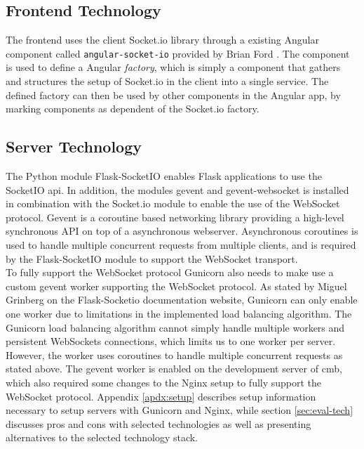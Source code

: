 \subsection{Frontend Technology}
The frontend uses the client Socket.io library \cite{SOCKETIO} through a existing Angular component called \texttt{angular-socket-io} provided by Brian Ford \cite{ANGULARSOCKETIO}. The component is used to define a Angular \textit{factory}, which is simply a component that gathers and structures the setup of Socket.io in the client into a single service. The defined factory can then be used by other components in the Angular app, by marking components as dependent of the Socket.io factory. \\

\subsection{Server Technology}
The Python module Flask-SocketIO \cite{FLASKSOCKETIO} enables Flask applications to use the SocketIO \gls{api}. In addition, the modules gevent \cite{GEVENT} and gevent-websocket \cite{GEVENTWEBSOCKET} is installed in combination with the Socket.io module to enable the use of the WebSocket protocol. Gevent is a coroutine based networking library providing a high-level synchronous API on top of a asynchronous webserver. Asynchronous coroutines is used to handle multiple concurrent requests from multiple clients, and is required by the Flask-SocketIO module to support the WebSocket transport. \\

To fully support the WebSocket protocol Gunicorn also needs to make use a custom gevent worker supporting the WebSocket protocol. As stated by Miguel Grinberg on the Flask-Socketio documentation website, Gunicorn can only enable one worker due to limitations in the implemented load balancing algorithm. The Gunicorn load balancing algorithm cannot simply handle multiple workers and persistent WebSockets connections, which limits us to one worker per server. However, the worker uses coroutines to handle multiple concurrent requests as stated above. The gevent worker is enabled on the development server of \gls{cmb}, which also required some changes to the Nginx setup to fully support the WebSocket protocol. Appendix \ref{apdx:setup} describes setup information necessary to setup servers with Gunicorn and Nginx, while section \ref{sec:eval-tech} discusses pros and cons with selected technologies as well as presenting alternatives to the selected technology stack.

